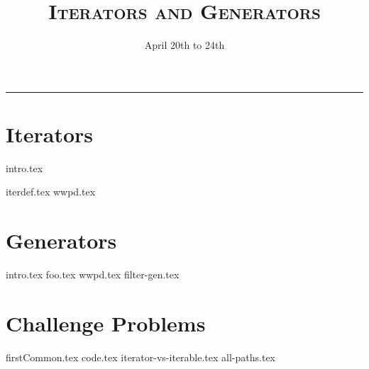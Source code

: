 \documentclass{exam}
\title{\textsc{Iterators and Generators}}
\date{April 20th to 24th}
\begin{document}
\maketitle
\rule{\textwidth}{0.15em}
\fontsize{12}{15}\selectfont

\section{Iterators}
{intro.tex}
\begin{questions}
\newpage
{iterdef.tex}
{wwpd.tex}
\newpage
\section{Generators}
{intro.tex}
\newpage
{foo.tex}
\newpage
{wwpd.tex}
{filter-gen.tex}
\newpage
\section{Challenge Problems}
{firstCommon.tex}
\newpage
{code.tex}
{iterator-vs-iterable.tex}
\newpage
{all-paths.tex}
\newpage
\end{questions}
\end{document}
